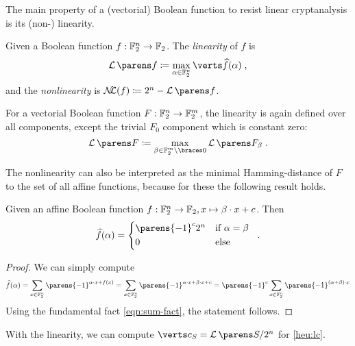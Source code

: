 The main property of a (vectorial) Boolean function to resist linear cryptanalysis is its (non-) linearity.
\begin{definition}
    Given a Boolean function $f : \mathbb{F}_2^n \to \mathbb{F}_2$.
    The \emph{linearity} of $f$ is
    \begin{equation*}
        \linearity{f} \coloneqq \max_{\alpha \in \F_2^n} \abs{\FC{f}(\alpha)}\;,
    \end{equation*}
    and the \emph{nonlinearity} is $\mathcal{N}\!\!\mathcal{L}(f) \coloneqq 2^n - \linearity{f}$.

    For a vectorial Boolean function $F : \mathbb{F}_2^n \to \mathbb{F}_2^m$, the linearity is again defined over all components, except the trivial $F_0$ component which is constant zero:
    \begin{equation*}
        \linearity{F} \coloneqq \max_{\beta \in \F_2^m \setminus \set{0}} \linearity{F_\beta}\;.
    \end{equation*}
\end{definition}

The nonlinearity can also be interpreted as the minimal Hamming-distance of $F$ to the set of all affine functions, because for these the following result holds.
\begin{lemma}
    Given an affine Boolean function $f : \mathbb{F}_2^n \to \mathbb{F}_2, x \mapsto \beta \cdot x + c$.
    Then
    \begin{equation*}
        \FC{f}(\alpha) = \begin{cases*}
            \parens{-1}^c 2^n & if $\alpha = \beta$ \\
            0                 & else
        \end{cases*}\;.
    \end{equation*}
\end{lemma}
\begin{proof}
    We can simply compute
    \begin{equation*}
           \FC{f}(\alpha)
        = \sum_{x \in \F_2^n} \parens{-1}^{\iprod{\alpha}{x} + f(x)}
        = \sum_{x \in \F_2^n} \parens{-1}^{\iprod{\alpha}{x} + \iprod{\beta}{x} + c}
        = \parens{-1}^c \sum_{x \in \F_2^n} \parens{-1}^{\iprod{(\alpha + \beta)}{x}}
    \end{equation*}
    Using the fundamental fact \cref{eqn:sum-fact}, the statement follows.
\end{proof}
With the linearity, we can compute $\abs{c_S} = \linearity{S}/2^n$ for \cref{heu:lc}.

